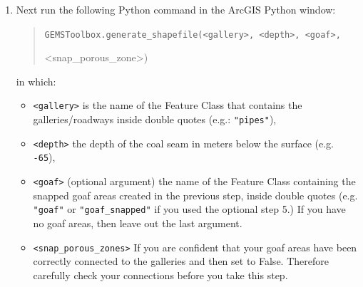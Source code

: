 \begin{enumerate}
    
   \item Next run the following Python command in the ArcGIS Python window: 
   \begin{quote}
       {\tt GEMSToolbox.generate\_shapefile(<gallery>, <depth>, <goaf>, 
       
       <snap\_porous\_zone>)}
   \end{quote}
   in which: 
    \begin{itemize}
       \item {\tt <gallery>} is the name of the Feature Class that contains the galleries/roadways inside double quotes (e.g.: {\tt "pipes"}), 
       \item {\tt <depth>} the depth of the coal seam in meters below the surface (e.g. {\tt -65}), 
       \item {\tt <goaf>} (optional argument) the name of the Feature Class containing the snapped goaf areas created in the previous step, inside double quotes (e.g. {\tt "goaf"}  or {\tt "goaf\_snapped"} if you used the optional step 5.) If you have no goaf areas, then leave out the last argument.
       \item {\tt <snap\_porous\_zones>} If you are confident that your goaf areas have been correctly connected to the galleries and then set to False. Therefore carefully check your connections before you take this step.


\end{itemize}
\end{enumerate}

